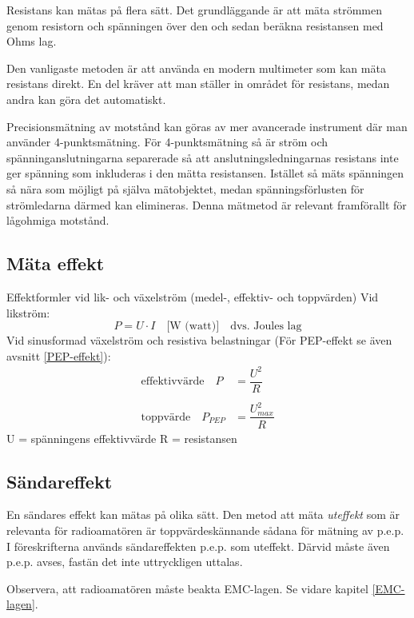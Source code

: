 Resistans kan mätas på flera sätt.
Det grundläggande är att mäta strömmen genom resistorn och spänningen över den
och sedan beräkna resistansen med Ohms lag.

Den vanligaste metoden är att använda en modern multimeter som kan mäta
resistans direkt.
En del kräver att man ställer in området för resistans, medan andra
kan göra det automatiskt.

Precisionsmätning av motstånd kan göras av mer avancerade instrument
där man använder 4-punkts\-mätning.
För 4-punktsmätning så är ström och spänninganslutningarna separerade
så att anslutningsledningarnas resistans inte ger spänning som inkluderas
i den mätta resistansen.
Istället så mäts spänningen så nära som möjligt på själva mätobjektet,
medan spänningsförlusten för strömledarna därmed kan elimineras.
Denna mätmetod är relevant framförallt för lågohmiga motstånd.

\subsection{Mäta effekt}
\label{mätaeffekt}

Effektformler vid lik- och växelström (medel-, effektiv- och toppvärden)
Vid likström:
%
\[
P = U \cdot I \quad \text{[W (watt)]} \quad \text{dvs. Joules lag}
\]
Vid sinusformad växelström och resistiva belastningar
(För PEP-effekt se även avsnitt \ref{PEP-effekt}):
\[
\begin{array}{ll}
\text{effektivvärde} \quad P & = \dfrac{U^2}{R} \\
&\\
\text{toppvärde}     \quad P_{PEP} & = \dfrac{U_{max}^2}{R}
\end{array}
\]
U = spänningens effektivvärde
R = resistansen

\subsection{Sändareffekt}

En sändares effekt kan mätas på olika sätt.
Den metod att mäta \emph{uteffekt} som är relevanta för radioamatören är
toppvärdeskännande sådana för mätning av p.e.p.
I föreskrifterna används sändareffekten p.e.p. som uteffekt.
Därvid måste även p.e.p. avses, fastän det inte uttryckligen uttalas.

Observera, att radioamatören måste beakta EMC-lagen.
Se vidare kapitel \ref{EMC-lagen}.

